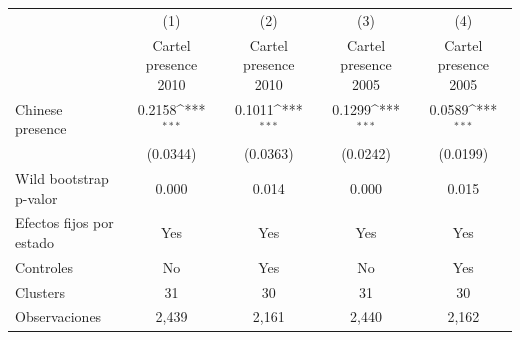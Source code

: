 {
\def\sym#1{\ifmmode^{#1}\else\(^{#1}\)\fi}
\begin{tabular}{l*{4}{c}}
\toprule
                    &\multicolumn{1}{c}{(1)}&\multicolumn{1}{c}{(2)}&\multicolumn{1}{c}{(3)}&\multicolumn{1}{c}{(4)}\\
                    &\multicolumn{1}{c}{Cartel presence 2010}&\multicolumn{1}{c}{Cartel presence 2010}&\multicolumn{1}{c}{Cartel presence 2005}&\multicolumn{1}{c}{Cartel presence 2005}\\
\midrule
Chinese presence    &      0.2158\sym{***}&      0.1011\sym{***}&      0.1299\sym{***}&      0.0589\sym{***}\\
                    &    (0.0344)         &    (0.0363)         &    (0.0242)         &    (0.0199)         \\
\midrule
Wild bootstrap p-valor&       0.000         &       0.014         &       0.000         &       0.015         \\
Efectos fijos por estado&         Yes         &         Yes         &         Yes         &         Yes         \\
Controles           &          No         &         Yes         &          No         &         Yes         \\
Clusters            &          31         &          30         &          31         &          30         \\
Observaciones       &       2,439         &       2,161         &       2,440         &       2,162         \\
\bottomrule
\end{tabular}
}
